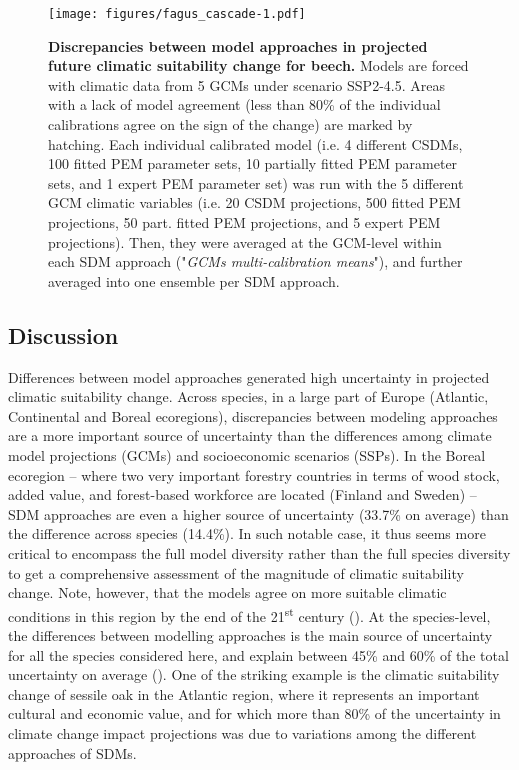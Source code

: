 \documentclass[letterpaper,8pt]{extarticle}  %
\begin{document}
\begin{doublespacing}
\begin{linenumbers}
\begin{figure}
\centering
\hspace*{-2cm}
\texttt{[image: figures/fagus\_cascade-1.pdf]}
\caption{\textbf{Discrepancies between model approaches in projected future climatic suitability change for beech.} Models are forced with climatic data from 5 GCMs under scenario SSP2-4.5. Areas with a lack of model agreement (less than 80\% of the individual calibrations agree on the sign of the change) are marked by hatching. Each individual calibrated model (i.e. 4 different CSDMs, 100 fitted PEM parameter sets, 10 partially fitted PEM parameter sets, and 1 expert PEM parameter set) was run with the 5 different GCM climatic variables (i.e. 20 CSDM projections, 500 fitted PEM projections, 50 part. fitted PEM projections, and 5 expert PEM projections). Then, they were averaged at the GCM-level within each SDM approach ("\emph{GCMs multi-calibration means}"), and further averaged into one ensemble per SDM approach.}
\label{fig:cascade}
\end{figure}

\subsection{Discussion}

Differences between model approaches generated high uncertainty in projected climatic suitability change. 
Across species, in a large part of Europe (Atlantic, Continental and Boreal ecoregions), discrepancies between modeling approaches are a more important source of uncertainty than the differences among climate model projections (GCMs) and socioeconomic scenarios (SSPs). In the Boreal ecoregion -- where two very important forestry countries in terms of wood stock, added value, and forest-based workforce are located (Finland and Sweden) -- SDM approaches are even a higher source of uncertainty (33.7\% on average) than the difference across species (14.4\%). In such notable case, it thus seems more critical to encompass the full model diversity rather than the full species diversity to get a comprehensive assessment of the magnitude of climatic suitability change. Note, however, that the models agree on more suitable climatic conditions in this region by the end of the 21\textsuperscript{st} century (). At the species-level, the differences between modelling approaches is the main source of uncertainty for all the species considered here, and explain between 45\% and 60\% of the total uncertainty on average (). 
One of the striking example is the climatic suitability change of sessile oak in the Atlantic region, where it represents an important cultural and economic value, and for which more than 80\% of the uncertainty in climate change impact projections was due to variations among the different approaches of SDMs.


\end{linenumbers}
\end{doublespacing}
\end{document}
